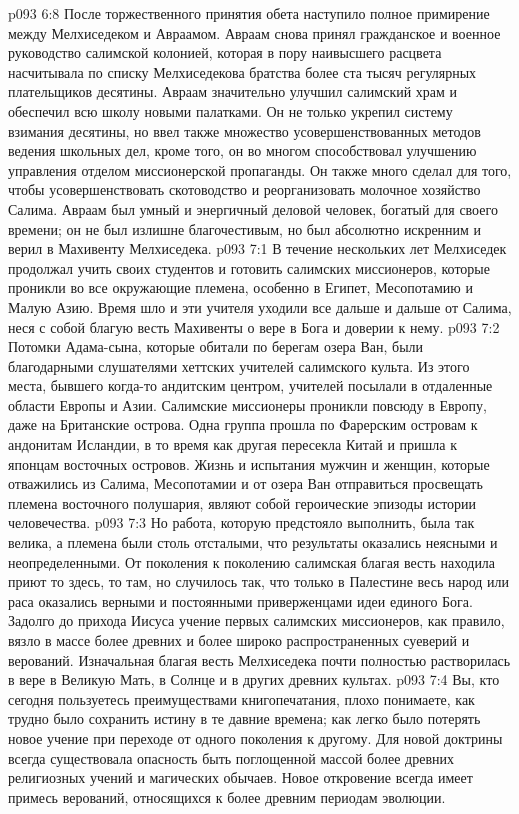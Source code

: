\vs p093 6:8 После торжественного принятия обета наступило полное примирение между Мелхиседеком и Авраамом. Авраам снова принял гражданское и военное руководство салимской колонией, которая в пору наивысшего расцвета насчитывала по списку Мелхиседекова братства более ста тысяч регулярных плательщиков десятины. Авраам значительно улучшил салимский храм и обеспечил всю школу новыми палатками. Он не только укрепил систему взимания десятины, но ввел также множество усовершенствованных методов ведения школьных дел, кроме того, он во многом способствовал улучшению управления отделом миссионерской пропаганды. Он также много сделал для того, чтобы усовершенствовать скотоводство и реорганизовать молочное хозяйство Салима. Авраам был умный и энергичный деловой человек, богатый для своего времени; он не был излишне благочестивым, но был абсолютно искренним и верил в Махивенту Мелхиседека.
\vs p093 7:1 В течение нескольких лет Мелхиседек продолжал учить своих студентов и готовить салимских миссионеров, которые проникли во все окружающие племена, особенно в Египет, Месопотамию и Малую Азию. Время шло и эти учителя уходили все дальше и дальше от Салима, неся с собой благую весть Махивенты о вере в Бога и доверии к нему.
\vs p093 7:2 Потомки Адама\hyp{}сына, которые обитали по берегам озера Ван, были благодарными слушателями хеттских учителей салимского культа. Из этого места, бывшего когда\hyp{}то андитским центром, учителей посылали в отдаленные области Европы и Азии. Салимские миссионеры проникли повсюду в Европу, даже на Британские острова. Одна группа прошла по Фарерским островам к андонитам Исландии, в то время как другая пересекла Китай и пришла к японцам восточных островов. Жизнь и испытания мужчин и женщин, которые отважились из Салима, Месопотамии и от озера Ван отправиться просвещать племена восточного полушария, являют собой героические эпизоды истории человечества.
\vs p093 7:3 Но работа, которую предстояло выполнить, была так велика, а племена были столь отсталыми, что результаты оказались неясными и неопределенными. От поколения к поколению салимская благая весть находила приют то здесь, то там, но случилось так, что только в Палестине весь народ или раса оказались верными и постоянными приверженцами идеи единого Бога. Задолго до прихода Иисуса учение первых салимских миссионеров, как правило, вязло в массе более древних и более широко распространенных суеверий и верований. Изначальная благая весть Мелхиседека почти полностью растворилась в вере в Великую Мать, в Солнце и в других древних культах.
\vs p093 7:4 \pc Вы, кто сегодня пользуетесь преимуществами книгопечатания, плохо понимаете, как трудно было сохранить истину в те давние времена; как легко было потерять новое учение при переходе от одного поколения к другому. Для новой доктрины всегда существовала опасность быть поглощенной массой более древних религиозных учений и магических обычаев. Новое откровение всегда имеет примесь верований, относящихся к более древним периодам эволюции.

